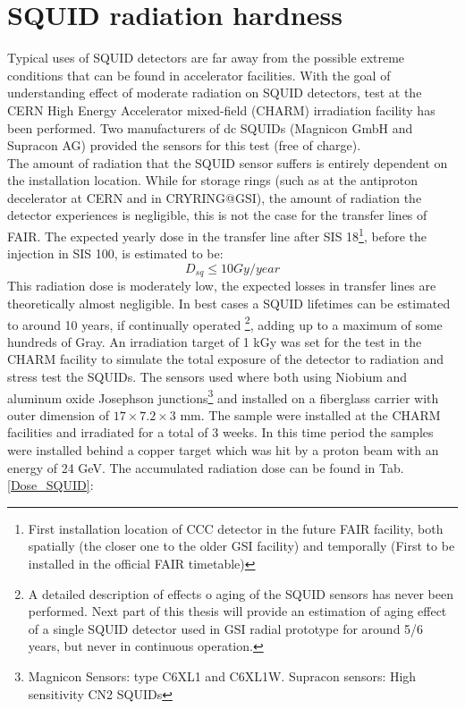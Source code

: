 \documentclass[12pt,a4paper]{report}
\begin{document}
    \section{SQUID radiation hardness}
    Typical uses of SQUID detectors are far away from the possible extreme conditions that can be found in accelerator facilities. With the goal of understanding effect of moderate radiation on SQUID detectors, test at the CERN High Energy Accelerator mixed-field (CHARM) irradiation facility \cite{CHARM} has been performed. Two manufacturers of dc SQUIDs (Magnicon GmbH and Supracon AG) provided the sensors for this test (free of charge). \\
    The amount of radiation that the SQUID sensor suffers is entirely dependent on the installation location. While for storage rings (such as at the antiproton decelerator at CERN and in CRYRING@GSI), the amount of radiation the detector experiences is negligible, this is not the case for the transfer lines of FAIR. The expected yearly dose in the transfer line after SIS 18\footnote{First installation location of CCC detector in the future FAIR facility, both spatially (the closer one to the older GSI facility) and temporally (First to be installed in the official FAIR timetable)}, before the injection in SIS 100, is estimated to be:
    \begin{equation}
    	D_{sq} \leq 10 Gy/year
    \end{equation}
    This radiation dose is moderately low, the expected losses in transfer lines are theoretically almost negligible. In best cases a SQUID lifetimes can be estimated to around 10 years, if continually operated \footnote{A detailed description of effects o aging of the SQUID sensors has never been performed. Next part of this thesis will provide an estimation of aging effect of a single SQUID detector used in GSI radial prototype for around 5/6 years, but never in continuous operation.}, adding up to a maximum of some hundreds of Gray. An irradiation target of 1 kGy was set for the test in the CHARM facility to simulate the total exposure of the detector to radiation and stress test the SQUIDs.
    The sensors used where both using Niobium and aluminum oxide Josephson junctions\footnote{Magnicon Sensors: type C6XL1 and C6XL1W. Supracon sensors: High sensitivity CN2 SQUIDs} and installed on a fiberglass carrier with outer dimension of $17\times7.2\times3$ mm. The sample were installed at the CHARM facilities and irradiated for a total of 3 weeks. In this time period the samples were installed behind a copper target which was hit by a proton beam with an energy of 24 GeV. The accumulated radiation dose can be found in Tab.\ref{Dose_SQUID}:
\end{document}
